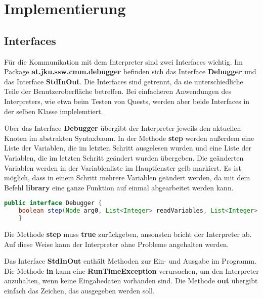 

\section{Implementierung}


\subsection{Interfaces}
\label{sec:deb-impl-interfaces}
Für die Kommunikation mit dem Interpreter sind zwei Interfaces wichtig. Im Package \textbf{at.jku.ssw.cmm.debugger} befinden sich das Interface \textbf{Debugger} und das Interface \textbf{StdInOut}. Die Interfaces sind getrennt, da sie unterschiedliche Teile der Benutzeroberfläche betreffen. Bei einfacheren Anwendungen des Interpreters, wie etwa beim Testen von Quests, werden aber beide Interfaces in der selben Klasse implelemtiert.

Über das Interface \textbf{Debugger} übergibt der Interpreter jeweils den aktuellen Knoten im abstrakten Syntaxbaum. In der Methode \textbf{step} werden außerdem eine Liste der Variablen, die im letzten Schritt ausgelesen wurden und eine Liste der Variablen, die im letzten Schritt geändert wurden übergeben. Die geänderten Variablen werden in der Variablenliste im Hauptfenster gelb markiert. Es ist möglich, dass in einem Schritt mehrere Variablen geändert werden, da mit dem Befehl \textbf{library} eine ganze Funktion auf einmal abgearbeitet werden kann.

\begin{lstlisting}[language=JAVA]
public interface Debugger {
	boolean step(Node arg0, List<Integer> readVariables, List<Integer> changedVariables);
	}
\end{lstlisting}

Die Methode \textbf{step} muss \textbf{true} zurückgeben, ansonsten bricht der Interpreter ab. Auf diese Weise kann der Interpreter ohne Probleme angehalten werden.

Das Interface \textbf{StdInOut} enthält Methoden zur Ein- und Ausgabe im Programm. Die Methode \textbf{in} kann eine \textbf{RunTimeException} verursachen, um den Interpreter anzuhalten, wenn keine Eingabedaten vorhanden sind. Die Methode \textbf{out} übergibt einfach das Zeichen, das ausgegeben werden soll.

